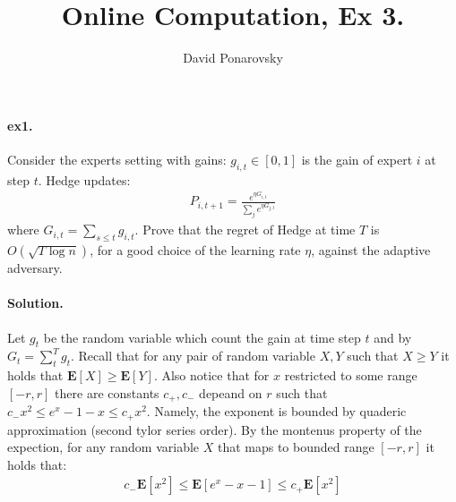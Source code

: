 \documentclass{article}
\newcommand{\expp}[1]{ \mathbf{E} \left[ {#1} \right]}
\begin{document}
\newcommand{\dalg}[1]{\expp{#1 : \text{alg} \sim \tilde{\text{alg}}}}
\newcommand{\dsig}[1]{\expp{#1 : \sigma \sim \tilde{\sigma}}}
\newcommand{\calg}{c_{\text{alg}}}
\newcommand{\cbase}{c_{\text{base}}}


\title{Online Computation, Ex 3.} 
\author{David Ponarovsky}
\maketitle

\begin{multicols*}{2}
  \paragraph{ex1.} Consider the experts setting with gains: $g_{i,t} \in \left[ 0,1 \right]$ is the gain of expert $i$ at step $t$. Hedge updates:  
  \begin{equation*}
    \begin{split}
      P_{i,t+1}= \frac{e^{\eta G_{i,t}}}{\sum_{j}{ e^{\eta G_{j,t}}} }
    \end{split}
  \end{equation*} where $G_{i,t} = \sum_{s\le t}{g_{i,t}} $. Prove that the regret of Hedge at time $T$ is $O\left( \sqrt{T\log n} \right)$, for a good choice of the learning rate $\eta$, against the adaptive adversary.  
  \paragraph{Solution.}
  Let $g_{t}$ be the random variable which count the gain at time step $t$ and by $G_{t} = \sum_{t}^{T}{g_{t}}$. Recall that for any pair of random variable $X,Y$ such that $X \ge Y$ it holds that $\expp{X} \ge \expp{Y}$. Also notice that for $x$ restricted to some range $[-r,r]$ there are constants $c_{+}, c_{-}$ depeand on $r$ such that $c_{-}x^{2} \le e^{x} - 1 - x \le c_{+}x^{2}$. Namely, the exponent is bounded by quaderic approximation (second tylor series order). By the montenus property of the expection, for any random variable $X$ that maps to bounded range $[-r,r]$ it holds that:
  \begin{equation*}
    \begin{split}
      c_{-}\expp{x^{2}}\le \expp{e^{x} - x - 1} \le c_{+}\expp{x^{2}}
    \end{split}
  \end{equation*}


\end{multicols*}
\end{document}
